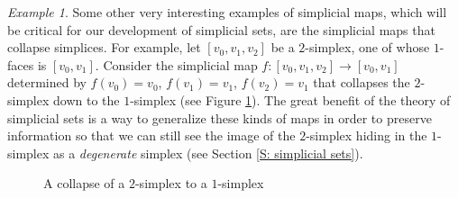 \documentclass[12pt]{article}
\theoremstyle{plain}
\theoremstyle{definition}
\theoremstyle{remark}
\newtheorem{example}[theorem]{Example}
\begin{document}
\begin{example}\label{E: collapse}
Some other  very interesting examples of simplicial maps, which will be critical for our development of  simplicial sets, are the simplicial maps that collapse simplices. For example, let $[v_0,v_1,v_2]$ be a $2$-simplex, one of whose $1$-faces is $[v_0,v_1]$.
Consider the simplicial map $f\colon [v_0,v_1,v_2]\to [v_0,v_1]$ determined by $f(v_0)=v_0$, $f(v_1)=v_1$, $f(v_2)=v_1$ that collapses the $2$-simplex down to the $1$-simplex (see Figure \ref{F: fig4}). The great benefit of the theory of simplicial sets is a way to generalize these kinds of maps in order to preserve information so that we can still see the image of the $2$-simplex hiding in the $1$-simplex as a \emph{degenerate} simplex (see Section \ref{S: simplicial sets}).
\end{example}


\begin{figure}[!htp]
\begin{center}
\end{center}
\caption{A collapse of a $2$-simplex to a $1$-simplex}\label{F: fig4}
\end{figure}
\end{document}

